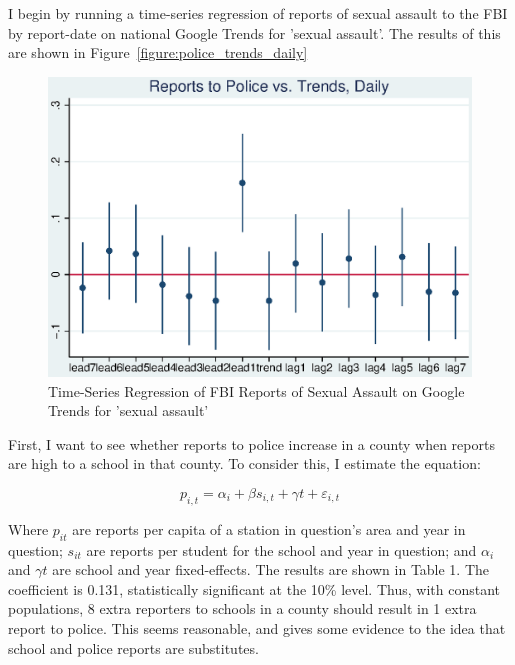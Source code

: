 \documentclass[AER,draftmode]{AEA}
\begin{document}
I begin by running a time-series regression of reports of sexual assault to the FBI by report-date on national Google Trends for 'sexual assault'. The results of this are shown in Figure~\ref{figure:police_trends_daily}

\begin{figure}
\includegraphics[]{figures/police_trend_daily.eps}
\caption{Time-Series Regression of FBI Reports of Sexual Assault on Google Trends for 'sexual assault'}
\end{figure}



First, I want to see whether reports to police increase in a county when reports are high to a school in that county. To consider this, I estimate the equation: 

$$ 
p_{i,t} = \alpha_{i} + \beta s_{i,t} + \gamma{t} + \varepsilon_{i,t}
$$ 

Where $p_{it}$ are reports per capita of a station in question's area and year in question; $s_{it}$ are reports per student for the school and year in question; and $\alpha_{i}$ and $\gamma{t}$ are school and year fixed-effects. The results are shown in Table 1. The coefficient is 0.131, statistically significant at the 10\% level. Thus, with constant populations, 8 extra reporters to schools in a county should result in 1 extra report to police.  This seems reasonable, and gives some evidence to the idea that school and police reports are substitutes. 
\end{document}
